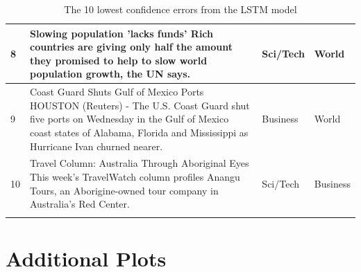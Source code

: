 \documentclass[12pt,a4paper,english]{article}
\begin{document}
\begin{table}[H]
\begin{longtable}{| m{2em} | m{25em} | m{5em} | m{5em} |}
        8 & Slowing population 'lacks funds' Rich countries are giving only half the amount they promised to help to slow world population growth, the UN says. & Sci/Tech & World \\ \hline
        
        9 & Coast Guard Shuts Gulf of Mexico Ports HOUSTON (Reuters) - The U.S. Coast Guard shut five ports on Wednesday in the Gulf of Mexico coast states of Alabama, Florida and Mississippi as Hurricane Ivan churned nearer. & Business & World \\ \hline
        
        10 & Travel Column: Australia Through Aboriginal Eyes This week's TravelWatch column profiles Anangu Tours, an Aborigine-owned tour company in Australia's Red Center. & Sci/Tech & Business \\ \hline

\caption{The 10 lowest confidence errors from the LSTM model}
\label{tab:misclassificationLSTM}
\end{longtable}
\end{table}


\section{Additional Plots}
\label{ap:plots}
\end{document}
